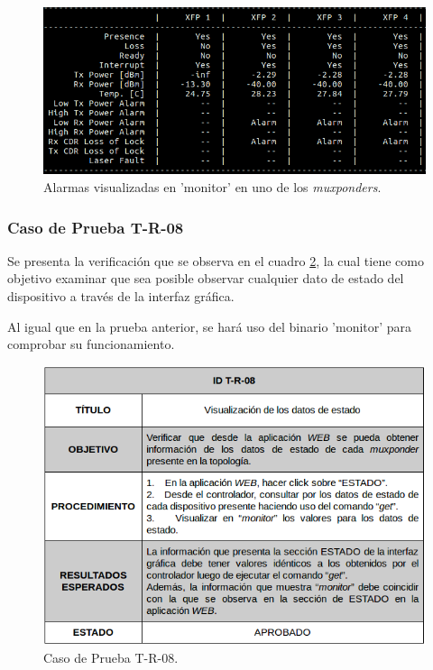   \begin{figure}[H]
	\centering
	\includegraphics[scale=0.5]{Figures/test7_3.png}
	\caption{Alarmas visualizadas en 'monitor' en uno de los \textit{muxponders}.}
	\label{fig:test7_3}
  \end{figure}

  \subsubsection{Caso de Prueba T-R-08}

  Se presenta la verificación que se observa en el cuadro \ref{fig:test8}, la cual tiene como objetivo examinar que sea posible observar cualquier dato de estado del dispositivo a través de la interfaz gráfica. 
  
  Al igual que en la prueba anterior, se hará uso del binario 'monitor' para comprobar su funcionamiento.
  
  
  \begin{figure}[H]
      \centering
      \includegraphics[scale=0.6]{Figures/test8.png}
      \caption{Caso de Prueba T-R-08.}
      \label{fig:test8}
    \end{figure}

